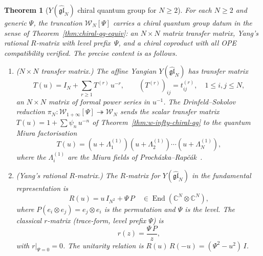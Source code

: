 \documentclass[11pt,reqno]{amsart}
\newtheorem{theorem}{Theorem}[section]
\theoremstyle{definition}
\theoremstyle{remark}
\newcommand{\cW}{\mathcal{W}}
\DeclareMathOperator{\End}{End}
\newcommand{\CC}{\mathbb{C}}
\numberwithin{equation}{section}
\begin{document}
\begin{theorem}[$Y(\widehat{\mathfrak{gl}}_N)$ chiral
quantum group for $N \geq 2$]
\label{thm:glN-chiral-qg}
For each $N \geq 2$ and generic $\Psi$, the truncation
$\cW_N[\Psi]$ carries a chiral quantum group datum in
the sense of
Theorem~\textup{\ref{thm:chiral-qg-equiv}}: an $N \times N$
matrix transfer matrix, Yang's rational $R$-matrix with
level prefix~$\Psi$, and a chiral coproduct with all
OPE compatibility verified.
The precise content is as follows.
\begin{enumerate}[label=\textup{(\Roman*)}]
\item \textup{($N \times N$ transfer matrix.)}
  The affine Yangian $Y(\widehat{\mathfrak{gl}}_N)$ has
  transfer matrix
  \begin{equation}\label{eq:glN-transfer}
    T(u)
    = I_N + \sum_{r \geq 1} T^{(r)}\, u^{-r},
    \qquad
    (T^{(r)})_{ij} = t_{ij}^{(r)},
    \quad 1 \leq i,j \leq N,
  \end{equation}
  an $N \times N$ matrix of formal power series in
  $u^{-1}$. The Drinfeld--Sokolov reduction
  $\pi_N \colon \cW_{1+\infty}[\Psi]
  \twoheadrightarrow \cW_N$ sends the scalar transfer
  matrix $T(u) = 1 + \sum \psi_n\, u^{-n}$ of
  Theorem~\textup{\ref{thm:w-infty-chiral-qg}}
  to the quantum Miura factorisation
  \begin{equation}\label{eq:glN-miura}
    T(u)
    = (u + \Lambda_1^{(1)})
    (u + \Lambda_2^{(1)})
    \cdots
    (u + \Lambda_N^{(1)}),
  \end{equation}
  where the $\Lambda_i^{(1)}$ are the Miura fields of
  Proch\'azka--Rap\v{c}\'ak~\textup{\cite{PR19}}.
\item \textup{(Yang's rational $R$-matrix.)}
  The $R$-matrix for $Y(\widehat{\mathfrak{gl}}_N)$
  in the fundamental representation is
  \begin{equation}\label{eq:glN-yang-r}
    R(u)
    = u\, I_{N^2} + \Psi\, P
    \quad \in \End(\CC^N \otimes \CC^N),
  \end{equation}
  where $P(e_i \otimes e_j) = e_j \otimes e_i$ is the
  permutation and $\Psi$ is the level.
  The classical $r$-matrix
  \textup{(}trace-form, level prefix
  $\Psi$\textup{)} is
  \begin{equation}\label{eq:glN-classical-r}
    r(z) = \frac{\Psi\, P}{z},
  \end{equation}
  with $r|_{\Psi = 0} = 0$. The unitarity relation is
  $R(u)\, R(-u) = (\Psi^2 - u^2)\, I$.

\end{enumerate}
\end{theorem}
\end{document}
